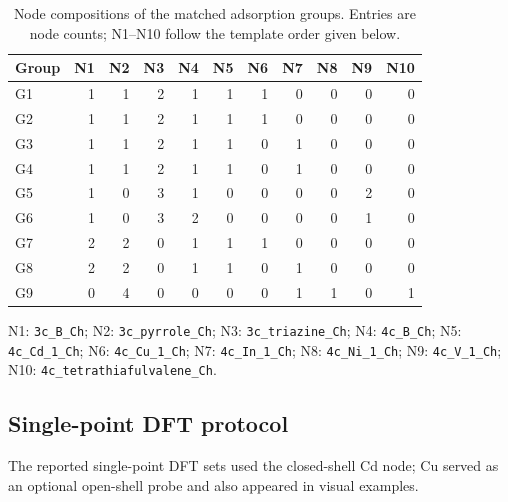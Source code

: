 \documentclass[a5paper, 10pt]{article}
\begin{document}
\begin{table}[H]
\centering\scriptsize
\setlength{\tabcolsep}{1.2mm}
\caption{Node compositions of the matched adsorption groups. Entries are node counts; N1--N10 follow the template order given below.}
\label{tab:adsorption_group_compositions}
\begin{tabular}{lrrrrrrrrrr}
\toprule
Group & N1 & N2 & N3 & N4 & N5 & N6 & N7 & N8 & N9 & N10 \\
\midrule
G1 & 1 & 1 & 2 & 1 & 1 & 1 & 0 & 0 & 0 & 0 \\
G2 & 1 & 1 & 2 & 1 & 1 & 1 & 0 & 0 & 0 & 0 \\
G3 & 1 & 1 & 2 & 1 & 1 & 0 & 1 & 0 & 0 & 0 \\
G4 & 1 & 1 & 2 & 1 & 1 & 0 & 1 & 0 & 0 & 0 \\
G5 & 1 & 0 & 3 & 1 & 0 & 0 & 0 & 0 & 2 & 0 \\
G6 & 1 & 0 & 3 & 2 & 0 & 0 & 0 & 0 & 1 & 0 \\
G7 & 2 & 2 & 0 & 1 & 1 & 1 & 0 & 0 & 0 & 0 \\
G8 & 2 & 2 & 0 & 1 & 1 & 0 & 1 & 0 & 0 & 0 \\
G9 & 0 & 4 & 0 & 0 & 0 & 0 & 1 & 1 & 0 & 1 \\
\bottomrule
\end{tabular}
\par\smallskip
\begin{minipage}{\linewidth}\raggedright\scriptsize
N1: \texttt{3c\_B\_Ch}; N2: \texttt{3c\_pyrrole\_Ch}; N3: \texttt{3c\_triazine\_Ch}; N4: \texttt{4c\_B\_Ch}; N5: \texttt{4c\_Cd\_1\_Ch}; N6: \texttt{4c\_Cu\_1\_Ch}; N7: \texttt{4c\_In\_1\_Ch}; N8: \texttt{4c\_Ni\_1\_Ch}; N9: \texttt{4c\_V\_1\_Ch}; N10: \texttt{4c\_tetrathiafulvalene\_Ch}.
\end{minipage}
\end{table}

\subsection{Single-point DFT protocol}
\label{app:dft_screening}

The reported single-point DFT sets used the closed-shell Cd node; Cu served as an optional open-shell probe and also appeared in visual examples.
\end{document}
